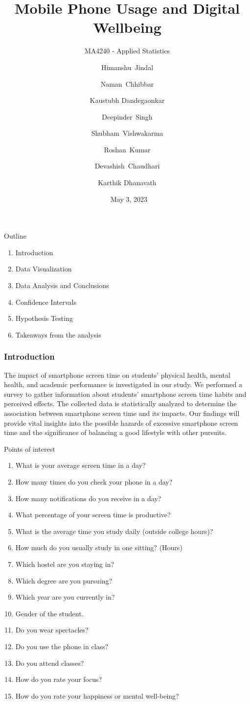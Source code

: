 \documentclass{beamer}
\title[MA4240 - Applied Statistics]{Mobile Phone Usage and Digital Wellbeing}
\subtitle{MA4240 - Applied Statistics}
\author[Group Project No: 3]{Himanshu~Jindal \and 
  Naman~Chhibbar \and
  Kaustubh Dandegaonkar\and
  Deepinder~Singh \and
  Shubham~Vishwakarma \and
  Roshan~Kumar \and
  Devashish~Chaudhari \and
  Karthik Dhanavath
  }
\date{\ May 3, 2023}
\begin{document}
\begin{frame}
\titlepage
\end{frame}

\begin{frame}{Outline}
    \begin{enumerate}
    \item{Introduction}
    \item{Data Visualization}
    \item{Data Analysis and Conclusions}
    \item{Confidence Intervals}
    \item{Hypothesis Testing}
    \item{Takeaways from the analysis}
\end{enumerate}
\end{frame}


\begin{frame}
\frametitle{Introduction}
\begin{block}{}
The impact of smartphone screen time on students’ physical health, mental health, and academic performance is investigated in our study. We performed a survey
to gather information about students’ smartphone screen time habits and perceived effects.
The collected data is statistically analyzed to determine the association between smartphone
screen time and its impacts. Our findings will provide vital insights into the possible hazards of excessive smartphone screen time and the significance of balancing a good lifestyle with other pursuits.
\end{block}
\end{frame}

\begin{frame}
\begin{block}{Points of interest}
\begin{enumerate}
\item What is your average screen time in a day?
\item How many times do you check your phone in a day?
\item How many notifications do you receive in a day?
\item What percentage of your screen time is productive?
\item What is the average time you study daily (outside college hours)?
\item How much do you usually study in one sitting? (Hours)
\item Which hostel are you staying in?
\item Which degree are you pursuing?	
\item Which year are you currently in?	
\item Gender of the student.	
\item Do you wear spectacles?	
\item Do you use the phone in class?	
\item Do you attend classes?	
\item How do you rate your focus?	
\item How do you rate your happiness or mental well-being?
\end{enumerate}
\end{block}
\end{frame}
\end{document}

